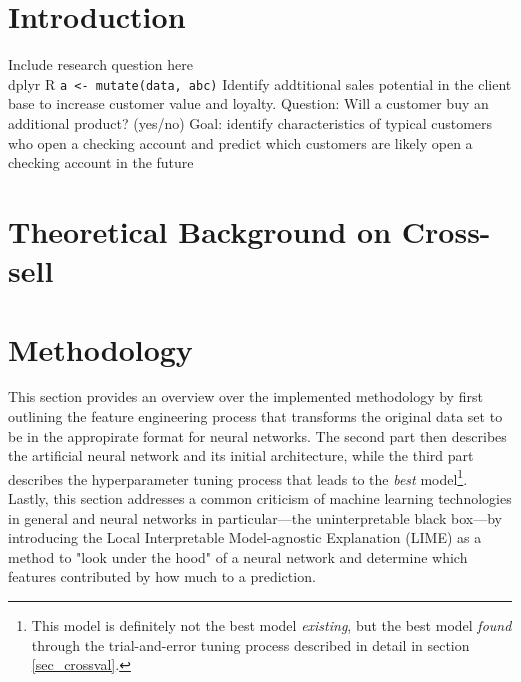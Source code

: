 \documentclass[12pt,a4paper]{article}
\newcommand{\pkg}[1]{{\normalfont\fontseries{b}\selectfont #1}}
\let\proglang=\textsf
\let\code=\texttt
\begin{document}
\pagebreak
\pagestyle{plain}
\tableofcontents
\pagebreak
\listoffigures
\listoftables
\newpage
\setcounter{page}{2}
\setlength{\baselineskip}{1.5\baselineskip}
\pagestyle{plain}


\section{Introduction}
\citep{hastieElementsStatisticalLearning2017}
Include research question here \\
\pkg{dplyr}
\proglang{R}
\code{a <- mutate(data, abc)}
Identify  addtitional  sales  potential in the client base to increase customer value and loyalty. \newline
Question: Will a customer buy an additional product? (yes/no) \newline
Goal: identify characteristics of typical customers who open a checking account and predict which customers
are likely open a checking account in the future
\section{Theoretical Background on Cross-sell}

\section{Methodology}
This section provides an overview over the implemented methodology by first outlining the feature engineering process that transforms the original data set
to be in the appropirate format for neural networks.
The second part then describes the artificial neural network and its initial architecture, while the third part describes the hyperparameter tuning process
that leads to the \textit{best} model\footnote{This model is definitely not the best model \textit{existing}, but the best model \textit{found} through the trial-and-error tuning process described in detail in section \ref{sec_crossval}.}.
Lastly, this section addresses a common criticism of machine learning technologies in general and neural networks in particular---the 
uninterpretable black box---by introducing the Local Interpretable Model-agnostic Explanation (LIME) as a method to 
"look under the hood" of a neural network and determine which features contributed by how much to a prediction.
\end{document}
